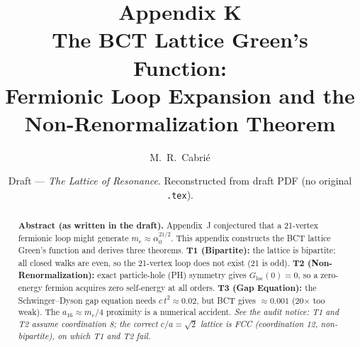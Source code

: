 \documentclass[aps,prl,preprint,superscriptaddress,floatfix]{revtex4-2}
\newcommand{\az}{\alpha_0}
\newcommand{\me}{m_e}
\newcommand{\Gloc}{G_{\mathrm{loc}}}
\begin{document}
\title{Appendix K\\ The BCT Lattice Green's Function:\\
Fermionic Loop Expansion and the Non-Renormalization Theorem}
\author{M.~R.~Cabri\'{e}}
\date{Draft --- \textit{The Lattice of Resonance}. Reconstructed from draft PDF (no original \texttt{.tex}).}

\begin{abstract}
\textbf{Abstract (as written in the draft).}
Appendix~J conjectured that a 21-vertex fermionic loop might generate
$\me\approx\az^{21/2}$. This appendix constructs the BCT lattice Green's
function and derives three theorems. \textbf{T1 (Bipartite):} the lattice is
bipartite; all closed walks are even, so the 21-vertex loop does not exist (21
is odd). \textbf{T2 (Non-Renormalization):} exact particle-hole (PH) symmetry
gives $\Gloc(0)=0$, so a zero-energy fermion acquires zero self-energy at all
orders. \textbf{T3 (Gap Equation):} the Schwinger--Dyson gap equation needs
$c\,t^2\approx0.02$, but BCT gives $\approx0.001$ (20$\times$ too weak). The
$a_{16}\approx\me/4$ proximity is a numerical accident. \emph{See the audit
notice: T1 and T2 assume coordination 8; the correct $c/a=\sqrt2$ lattice is
FCC (coordination 12, non-bipartite), on which T1 and T2 fail.}
\end{abstract}

\maketitle
\end{document}
